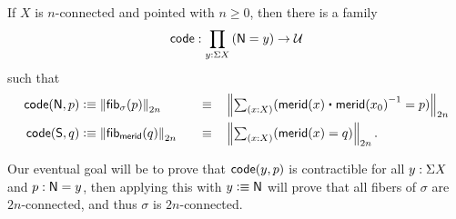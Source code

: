 \begin{lem}\label{thm:freudcode}
  If $X$ is $n$-connected and pointed with $n\geq 0$, then there is a family
  \begin{equation}
    \code:\prd{y:\susp X} (\north=y) \to \type\label{eq:freudcode}
  \end{equation}
  such that
  \begin{alignat}{2}
    \code(\north,p) &\defeq \trunc{2n}{\hfib{\sigma}{p}}
    &\quad\jdeq\quad & \trunc{2n}{\tsm{x:X} (\merid(x) \ct \opp{\merid(x_0)} = p)}\label{eq:freudcodeN}\\
    \code(\south,q) &\defeq \trunc{2n}{\hfib{\merid}{q}}
    &\quad\jdeq\quad & \trunc{2n}{\tsm{x:X} (\merid(x) = q)}.\label{eq:freudcodeS}
  \end{alignat}
\end{lem}

Our eventual goal will be to prove that $\mathsf{code}(y,p)$ is contractible for all $y:\Sigma X$ and $p:\mathsf{N}=y$, then applying this with $y\vcentcolon\equiv \mathsf{N}$ will prove that all fibers of $\sigma$ are $2n$-connected, and thus $\sigma$ is $2n$-connected.

